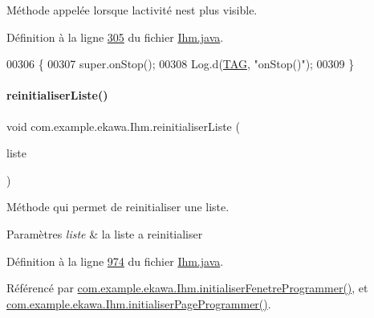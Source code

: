 Méthode appelée lorsque l\textquotesingle{}activité n\textquotesingle{}est plus visible. 



Définition à la ligne \hyperlink{_ihm_8java_source_l00305}{305} du fichier \hyperlink{_ihm_8java_source}{Ihm.\+java}.


\begin{DoxyCode}
00306     \{
00307         super.onStop();
00308         Log.d(\hyperlink{classcom_1_1example_1_1ekawa_1_1_ihm_a95cd92c2acaf9f8982302da08d94f9aa}{TAG}, \textcolor{stringliteral}{"onStop()"});
00309     \}
\end{DoxyCode}
\mbox{\label{classcom_1_1example_1_1ekawa_1_1_ihm_a4c6ea5a7de9f8fc5c820fa4c8ce14838}} 
\paragraph{\texorpdfstring{reinitialiser\+Liste()}{reinitialiserListe()}}
{\footnotesize\ttfamily void com.\+example.\+ekawa.\+Ihm.\+reinitialiser\+Liste (\begin{DoxyParamCaption}\item[{List\+View}]{liste }\end{DoxyParamCaption})\hspace{0.3cm}{\ttfamily [private]}}



Méthode qui permet de reinitialiser une liste. 


\begin{DoxyItemize}
\item 
\begin{DoxyParams}{Paramètres}
{\em liste} & la liste a reinitialiser \\
\hline
\end{DoxyParams}

\end{DoxyItemize}

Définition à la ligne \hyperlink{_ihm_8java_source_l00974}{974} du fichier \hyperlink{_ihm_8java_source}{Ihm.\+java}.



Référencé par \hyperlink{_ihm_8java_source_l00727}{com.\+example.\+ekawa.\+Ihm.\+initialiser\+Fenetre\+Programmer()}, et \hyperlink{_ihm_8java_source_l00668}{com.\+example.\+ekawa.\+Ihm.\+initialiser\+Page\+Programmer()}.


